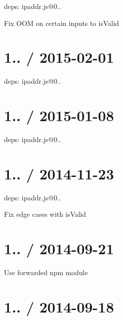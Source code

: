 
\begin{DoxyItemize}
\item deps\+: ipaddr.\+js@0..
\begin{DoxyItemize}
\item Fix O\+O\+M on certain inputs to {\ttfamily is\+Valid}
\end{DoxyItemize}
\end{DoxyItemize}

\section*{1.. / 2015-\/02-\/01 }


\begin{DoxyItemize}
\item deps\+: ipaddr.\+js@0..
\end{DoxyItemize}

\section*{1.. / 2015-\/01-\/08 }


\begin{DoxyItemize}
\item deps\+: ipaddr.\+js@0..
\end{DoxyItemize}

\section*{1.. / 2014-\/11-\/23 }


\begin{DoxyItemize}
\item deps\+: ipaddr.\+js@0..
\begin{DoxyItemize}
\item Fix edge cases with {\ttfamily is\+Valid}
\end{DoxyItemize}
\end{DoxyItemize}

\section*{1.. / 2014-\/09-\/21 }


\begin{DoxyItemize}
\item Use {\ttfamily forwarded} npm module
\end{DoxyItemize}

\section*{1.. / 2014-\/09-\/18 }


